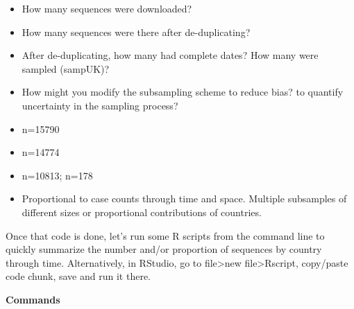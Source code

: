 \documentclass[
]{book}
\providecommand{\tightlist}{%
  \setlength{\itemsep}{0pt}\setlength{\parskip}{0pt}}
\begin{document}
\begin{itemize}
\tightlist
\item
  How many sequences were downloaded?
\item
  How many sequences were there after de-duplicating?
\item
  After de-duplicating, how many had complete dates? How many were sampled (sampUK)?
\item
  How might you modify the subsampling scheme to reduce bias? to quantify uncertainty in the sampling process?
\end{itemize}

\begin{itemize}
\tightlist
\item
  n=15790
\item
  n=14774
\item
  n=10813; n=178
\item
  Proportional to case counts through time and space. Multiple subsamples of different sizes or proportional contributions of countries.
\end{itemize}

Once that code is done, let's run some R scripts from the command line to quickly summarize the number and/or proportion of sequences by country through time. Alternatively, in RStudio, go to file\textgreater new file\textgreater Rscript, copy/paste code chunk, save and run it there.

\textbf{Commands}
\end{document}
